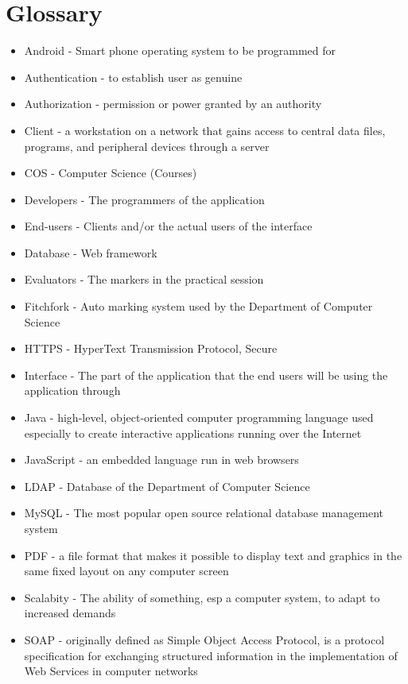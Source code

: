 \section{Glossary}
\begin{itemize}

\item Android - Smart phone operating system to be programmed for
\item Authentication - to establish user as genuine
\item Authorization - permission or power granted by an authority
\item Client - a workstation on a network that gains access to central data files, programs, and peripheral devices through a server
\item COS - Computer Science (Courses)
\item Developers - The programmers of the application

\item End-users - Clients and/or the actual users of the interface
\item Database - Web framework
\item Evaluators - The markers in the practical session
\item Fitchfork - Auto marking system used by the Department of Computer Science
\item HTTPS - HyperText Transmission Protocol, Secure 
\item Interface - The part of the application that the end users will be using the application through
\item Java -  high-level, object-oriented computer programming language used especially to create interactive applications running over the Internet
\item JavaScript - an embedded language run in web browsers
\item LDAP - Database of the Department of Computer Science
\item MySQL - The most popular open source relational database management system
\item PDF - a file format that makes it possible to display text and graphics in the same fixed layout on any computer screen
\item Scalabity - The ability of something, esp a computer system, to adapt to increased demands
\item SOAP - originally defined as Simple Object Access Protocol, is a protocol specification for exchanging structured information in the implementation of Web Services in computer networks


\end{itemize}
